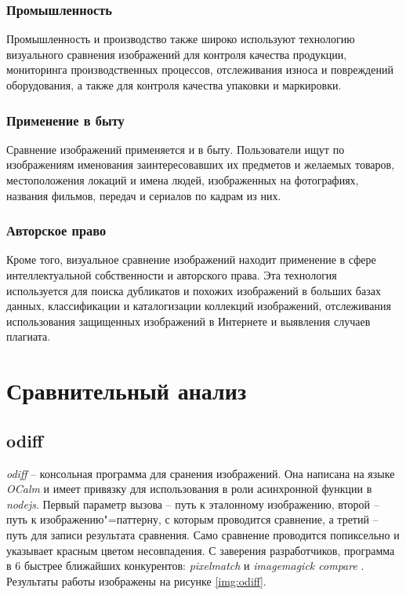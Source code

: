 \documentclass[variant=courcework]{bsuir}
\begin{document}
\subsubsection{Промышленность}
Промышленность и производство также широко используют технологию визуального
сравнения изображений для контроля качества продукции, мониторинга
производственных процессов, отслеживания износа и повреждений оборудования, а
также для контроля качества упаковки и маркировки.

\subsubsection{Применение в быту}
Сравнение изображений применяется и в быту. Пользователи ищут по изображениям
именования заинтересовавших их предметов и желаемых товаров, местоположения
локаций и имена людей, изображенных на фотографиях, названия фильмов, передач и
сериалов по кадрам из них.

\subsubsection{Авторское право}
Кроме того, визуальное сравнение изображений находит применение в сфере
интеллектуальной собственности и авторского права. Эта технология используется
для поиска дубликатов и похожих изображений в больших базах данных,
классификации и каталогизации коллекций изображений, отслеживания использования
защищенных изображений в Интернете и выявления случаев плагиата.

\section{Сравнительный анализ}

\subsection{odiff}

\textit{odiff} -- консольная программа для сранения изображений. Она написана на
языке \textit{OCalm} и имеет привязку для использования в роли асинхронной
функции в \textit{nodejs}. Первый параметр вызова -- путь к эталонному
изображению, второй -- путь к изображению"=паттерну, с которым проводится
сравнение, а третий -- путь для записи результата сравнения. Само сравнение
проводится попиксельно и указывает красным цветом несовпадения. С заверения
разработчиков, программа в 6 быстрее ближайших конкурентов: \textit{pixelmatch}
и \textit{imagemagick compare} \cite{about-odiff}. Результаты работы изображены
на рисунке \ref{img:odiff}.
\end{document}

